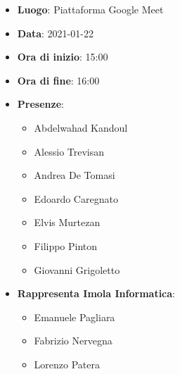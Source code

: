 \begin{itemize}
    \item \textbf{Luogo}: Piattaforma Google Meet
    \item \textbf{Data}: 2021-01-22
    \item \textbf{Ora di inizio}: 15:00
    \item \textbf{Ora di fine}: 16:00
    \item \textbf{Presenze}:
          \begin{itemize}
              \item Abdelwahad Kandoul
              \item Alessio Trevisan
              \item Andrea De Tomasi
              \item Edoardo Caregnato
              \item Elvis Murtezan
              \item Filippo Pinton
              \item Giovanni Grigoletto
          \end{itemize}
    \item \textbf{Rappresenta Imola Informatica}:
        \begin{itemize}
            \item Emanuele Pagliara
            \item Fabrizio Nervegna
            \item Lorenzo Patera
        \end{itemize}
\end{itemize}